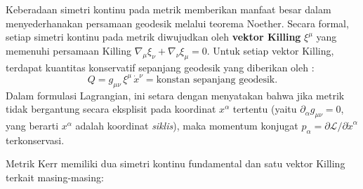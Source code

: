Keberadaan simetri kontinu pada metrik memberikan manfaat besar dalam menyederhanakan persamaan geodesik melalui teorema Noether. Secara formal, setiap simetri kontinu pada metrik diwujudkan oleh \textbf{vektor Killing} $\xi^\mu$ yang memenuhi persamaan Killing $\nabla_\mu \xi_\nu + \nabla_\nu \xi_\mu = 0$. Untuk setiap vektor Killing, terdapat kuantitas konservatif sepanjang geodesik yang diberikan oleh \parencite{Carroll2004SpacetimeGeometry}:
\begin{equation}
    Q = g_{\mu\nu}\, \xi^\mu\, \dot{x}^\nu = \text{konstan sepanjang geodesik}.
    \label{eq:killing-conserved}
\end{equation}
Dalam formulasi Lagrangian, ini setara dengan menyatakan bahwa jika metrik tidak bergantung secara eksplisit pada koordinat $x^\alpha$ tertentu (yaitu $\partial_\alpha g_{\mu\nu} = 0$, yang berarti $x^\alpha$ adalah koordinat \textit{siklis}), maka momentum konjugat $p_\alpha = \partial\mathcal{L}/\partial\dot{x}^\alpha$ terkonservasi.

Metrik Kerr memiliki dua simetri kontinu fundamental dan satu vektor Killing terkait masing-masing:

